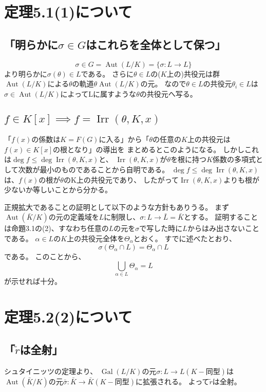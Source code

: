 \documentclass[a4j]{jarticle}
\newcommand{\Aut}{\operatorname{Aut}}
\newcommand{\Gal}{\operatorname{Gal}}
\newcommand{\Irr}{\operatorname{Irr}}
\begin{document}
    \section{定理5.1(1)について}
        \subsection{「明らかに$\sigma \in G$はこれらを全体として保つ」}
        \[ \sigma \in G = \Aut(L/K)=\{ \sigma : L \to L \} \]
        より明らかに$\sigma(\theta) \in L$である。
        さらに$\theta \in L$の($K$上の)共役元は群$\Aut(L/K)$による$\theta$の軌道$\theta \Aut(L/K)$の元。
        なので$\theta \in L$の共役元$\theta_i \in L$は$\sigma \in \Aut(L/K)$によってLに属すような$\theta$の共役元へ写る。

        \subsection{$f \in K[x] \implies f = \Irr(\theta, K, x)$}
        「$f(x)$の係数は$K=F(G)$に入る」から「$\theta$の任意の$K$上の共役元は$f(x) \in K[x]$の根となり」の導出を
        まとめるとこのようになる。
        しかしこれは$\deg f \leq \deg \Irr(\theta, K, x)$と、
        $\Irr(\theta, K, x)$が$\theta$を根に持つ$K$係数の多項式として次数が最小のものであることから自明である。
        $\deg f \leq \deg \Irr(\theta, K, x)$は、$f(x)$の根が$\theta$のK上の共役元であり、
        したがって$\Irr(\theta, K, x)$よりも根が少ないか等しいことから分かる。

        正規拡大であることの証明として以下のような方針もありうる。
        まず$\Aut(\bar{K}/K)$の元の定義域を$L$に制限し、$\sigma: L \to \bar{L}=\bar{K}$とする。
        証明することは命題3.1の(2)、すなわち任意の$L$の元を$\sigma$で写した時に$L$からはみ出さないことである。
        $\alpha \in L$の$K$上の共役元全体を$\Theta_{\alpha}$とおく。
        すでに述べたとおり、\[ \sigma(\Theta_{\alpha} \cap L)=\Theta_{\alpha} \cap L \]である。
        このことから、\[ \bigcup_{\alpha \in L}{\Theta_{\alpha}}=L \]が示せれば十分。

    \section{定理5.2(2)について}
        \subsection{「$\tilde{r}$は全射」}
        シュタイニッツの定理より、
        $\Gal(L/K)$の元$\sigma:L \to L(K-\mbox{同型})$は
        $\Aut(\bar{K}/K)$の元$\bar{\sigma}:\bar{K} \to \bar{K}(K-\mbox{同型})$に拡張される。
        よって$\tilde{r}$は全射。
        
\end{document}
